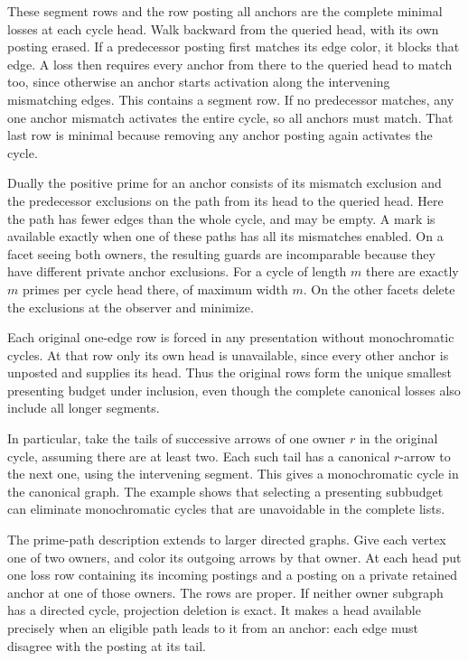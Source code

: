 These segment rows and the row posting all anchors
are the complete minimal losses at each cycle head.
Walk backward from the queried head, with its own
posting erased. If a predecessor posting first
matches its edge color, it blocks that edge. A loss
then requires every anchor from there to the queried
head to match too, since otherwise an anchor starts
activation along the intervening mismatching edges.
This contains a segment row. If no predecessor
matches, any one anchor mismatch activates the
entire cycle, so all anchors must match. That last
row is minimal because removing any anchor posting
again activates the cycle.

Dually the positive prime for an anchor consists of
its mismatch exclusion and the predecessor exclusions
on the path from its head to the queried head. Here
the path has fewer edges than the whole cycle, and
may be empty. A mark is available exactly when one
of these paths has all its mismatches enabled. On a
facet seeing both owners, the resulting guards are
incomparable because they have different private
anchor exclusions. For a cycle of length $m$ there
are exactly $m$ primes per cycle head there, of
maximum width $m$. On the other facets delete the
exclusions at the observer and minimize.

Each original one-edge row is forced in any
presentation without monochromatic cycles. At that
row only its own head is unavailable, since every
other anchor is unposted and supplies its head.
Thus the original rows form the unique smallest
presenting budget under inclusion, even though the
complete canonical losses also include all longer
segments.

In particular, take the tails of successive arrows of
one owner $r$ in the original cycle, assuming there
are at least two. Each such tail has a canonical
$r$-arrow to the next one, using the intervening
segment. This gives a monochromatic cycle in the
canonical graph. The example shows that selecting
a presenting subbudget can eliminate monochromatic
cycles that are unavoidable in the complete lists.

The prime-path description extends to larger directed
graphs. Give each vertex one of two owners, and color its
outgoing arrows by that owner. At each head put one
loss row containing its incoming postings and a posting
on a private retained anchor at one of those owners.
The rows are proper. If neither owner subgraph has
a directed cycle, projection
deletion is exact. It makes a head available precisely
when an eligible path leads to it from an anchor:
each edge must disagree with the posting at its tail.

